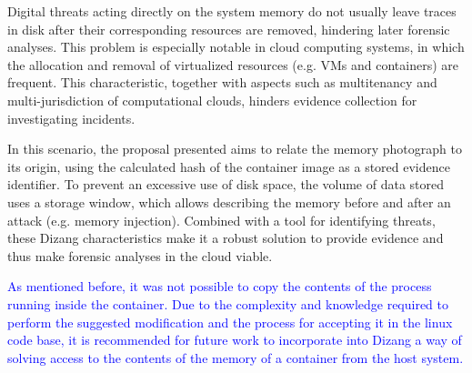 \documentclass[conference]{IEEEtran}
\newcommand{\fancyname}{Dizang }
\begin{document}
Digital threats acting directly on the system memory do not usually leave traces in disk after their corresponding resources are removed, hindering later forensic analyses.
%
This problem is especially notable in cloud computing systems, in which the allocation and removal of virtualized resources (e.g. VMs and containers) are frequent.
%
This characteristic, together with aspects such as multitenancy and multi-jurisdiction of computational clouds, hinders evidence collection for investigating incidents.


In this scenario, the proposal presented aims to relate the memory photograph to its origin, using the calculated hash of the container image as a stored evidence identifier.
%
To prevent an excessive use of disk space, the volume of data stored uses a storage window, which allows describing the memory before and after an attack (e.g. memory injection).
%
Combined with a tool for identifying threats, these \fancyname characteristics make it a robust solution to provide evidence and thus make forensic analyses in the cloud viable.
%

\textcolor{blue}{As mentioned before, it was not possible to copy the contents of the process running inside the container.
%
Due to the complexity and knowledge required to perform the suggested modification and the process for accepting it in the linux code base, it is recommended for future work to incorporate into \fancyname a way of solving access to the contents of the memory of a container from the host system.}








\end{document}
